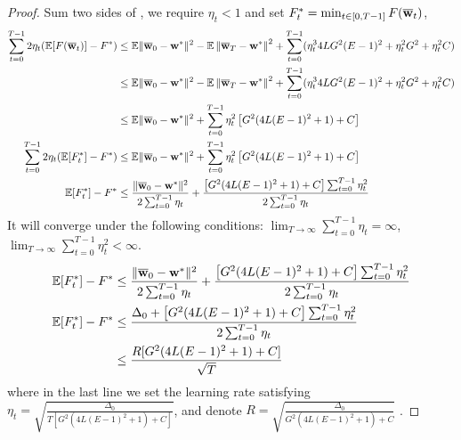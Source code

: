 \begin{proof}
Sum two sides of \eq{\ref{eq:cvxsgd1}}, we require $\eta_t < 1$ and set $F^*_t = \min_{t \in [0, T-1]} F({\overline{\mathbf{w}}}_t)$, 
\begin{align*}
	\sum_{t=0}^{T-1} 2\eta_t (\mathbb{E}[F({\overline{\mathbf{w}}}_t)] - F^* ) & \leq \mathbb{E} \|{\overline{\mathbf{w}}}_{0}-{\mathbf{w}}^{*}\|^{2} - \mathbb{E}\left\|{\overline{\mathbf{w}}}_{T}-{\mathbf{w}}^{*}\right\|^2 + \sum_{t=0}^{T-1} (\eta_t^3 4LG^2(E-1)^2 + \eta_t^2 G^2+ \eta_t^2 C)\\ 
    & \leq \mathbb{E} \|{\overline{\mathbf{w}}}_{0}-{\mathbf{w}}^{*}\|^{2} - \mathbb{E}\left\|{\overline{\mathbf{w}}}_{T}-{\mathbf{w}}^{*}\right\|^2 + \sum_{t=0}^{T-1} (\eta_t^3 4LG^2(E-1)^2 + \eta_t^2 G^2+ \eta_t^2 C)\\ 
    & \leq \mathbb{E} \|{\overline{\mathbf{w}}}_{0}-{\mathbf{w}}^{*}\|^{2} + \sum_{t=0}^{T-1}\eta_t^2\left[ G^2 ( 4L(E-1)^2 + 1) + C\right]\\
    \sum_{t=0}^{T-1} 2\eta_t (\mathbb{E}[F^*_t] - F^* ) & \leq \mathbb{E} \|{\overline{\mathbf{w}}}_{0}-{\mathbf{w}}^{*}\|^{2} + \sum_{t=0}^{T-1}\eta_t^2\left[ G^2 ( 4L(E-1)^2 + 1) + C\right]\\
\mathbb{E}[ F_t^*] - F^*  & \leq \frac{\|{\overline{\mathbf{w}}}_{0}-{\mathbf{w}}^{*}\|^{2}}{2 \sum_{t=0}^{T-1} \eta_t } + \frac{\left[G^2( 4L(E-1)^2 + 1) + C\right] \sum_{t=0}^{T-1} \eta_t^2}{2 \sum_{t=0}^{T-1} \eta_t }
\end{align*}
It will converge under the following conditions: $ \lim_{T \rightarrow \infty }\sum_{t=0}^{T-1} \eta_t = \infty$, 
$ \lim_{T \rightarrow \infty }\sum_{t=0}^{T-1} \eta_t^2 < \infty$. 
\begin{align*}
	\mathbb{E}[ F_t^*] - F^*  & \leq \frac{\|{\overline{\mathbf{w}}}_{0}-{\mathbf{w}}^{*}\|^{2}}{2 \sum_{t=0}^{T-1} \eta_t } + \frac{\left[G^2( 4L(E-1)^2 + 1) + C\right] \sum_{t=0}^{T-1} \eta_t^2}{2 \sum_{t=0}^{T-1} \eta_t } \\
	\mathbb{E}[ F_t^*] - F^*  & \leq \frac{\Delta_0 + \left[G^2( 4L(E-1)^2 + 1) + C\right] \sum_{t=0}^{T-1} \eta_t^2 }{2 \sum_{t=0}^{T-1} \eta_t }\\
	& \leq \frac{R [G^2( 4L(E-1)^2 + 1) + C] }{\sqrt{T}}
\end{align*}
where in the last line we set the learning rate satisfying $\eta_t = \sqrt{ \frac{\Delta_0}{ T [G^2( 4L(E-1)^2 + 1) + C] }}$, 
and denote $R = \sqrt{ \frac{\Delta_0}{ G^2( 4L(E-1)^2 + 1) + C }}$ .
\end{proof}